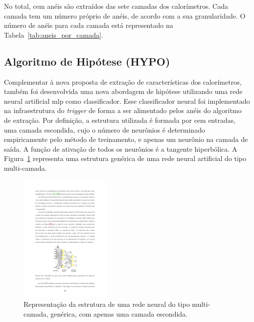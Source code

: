 No total, cem anéis são extraídos das sete camadas dos calorímetros. Cada camada tem um número próprio de anéis, de acordo com a sua granularidade. O número de anéis
para cada camada está representado na Tabela~\ref{tab:aneis_por_camada}.


\begin{table}[h]
\centering
{}
\caption[Número de anéis extraídos em cada camada dos calorímetros]{Número de anéis extraídos para cada uma das camadas dos calorímetros
eletromagnético e hadrônico do \gls{atlas}.}
\label{tab:aneis_por_camada}
\end{table}

\subsection{Algoritmo de Hipótese (HYPO)}

Complementar à nova proposta de extração de características dos calorímetros, também foi desenvolvida uma nova abordagem de
hipótese utilizando uma rede neural artificial  \gls{mlp} como classificador. Esse classificador neural foi implementado na infraestrutura
do \textit{trigger} de forma a ser alimentado pelos anéis do algoritmo de extração. Por definição, a estrutura utilizada é formada 
por cem entradas, uma camada escondida, cujo o número de neurônios é determinado empiricamente pelo método
de treinamento, e apenas um neurônio na camada de saída. A função de ativação de todos os neurônios é a tangente hiperbólica.
A Figura~\ref{fig:topologia_rna} representa uma estrutura genérica de uma rede neural artificial do tipo multi-camada.

\begin{figure}[h!t]
\centering
\includegraphics[width=0.4\textwidth]{figures/topologia_rna.pdf}
\caption[Representação da estrutura de uma rede neural do tipo multicamada.]
{Representação da estrutura de uma rede neural do tipo multi-camada, genérica, com apenas uma camada escondida.}
\label{fig:topologia_rna}
\end{figure}

